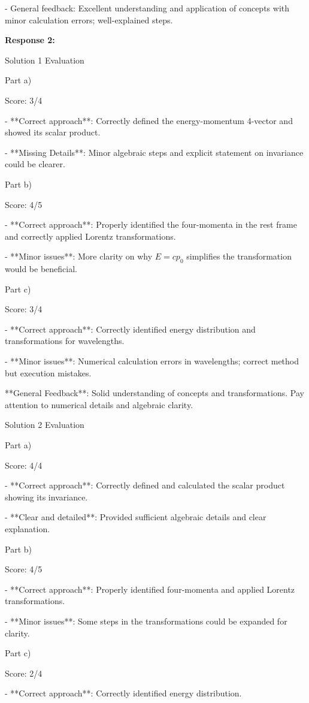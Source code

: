 \documentclass[a4paper,11pt]{article}
\begin{document}
- General feedback: Excellent understanding and application of concepts with minor calculation errors; well-explained steps.

\bigskip
\textbf{Response 2:}

Solution 1 Evaluation

Part a)

Score: 3/4

- **Correct approach**: Correctly defined the energy-momentum 4-vector and showed its scalar product.

- **Missing Details**: Minor algebraic steps and explicit statement on invariance could be clearer.

Part b)

Score: 4/5

- **Correct approach**: Properly identified the four-momenta in the rest frame and correctly applied Lorentz transformations.

- **Minor issues**: More clarity on why \( E = cp_0 \) simplifies the transformation would be beneficial.

Part c)

Score: 3/4

- **Correct approach**: Correctly identified energy distribution and transformations for wavelengths.

- **Minor issues**: Numerical calculation errors in wavelengths; correct method but execution mistakes.

**General Feedback**: Solid understanding of concepts and transformations. Pay attention to numerical details and algebraic clarity.

Solution 2 Evaluation

Part a)

Score: 4/4

- **Correct approach**: Correctly defined and calculated the scalar product showing its invariance.

- **Clear and detailed**: Provided sufficient algebraic details and clear explanation.

Part b)

Score: 4/5

- **Correct approach**: Properly identified four-momenta and applied Lorentz transformations.

- **Minor issues**: Some steps in the transformations could be expanded for clarity.

Part c)

Score: 2/4

- **Correct approach**: Correctly identified energy distribution.
\end{document}
